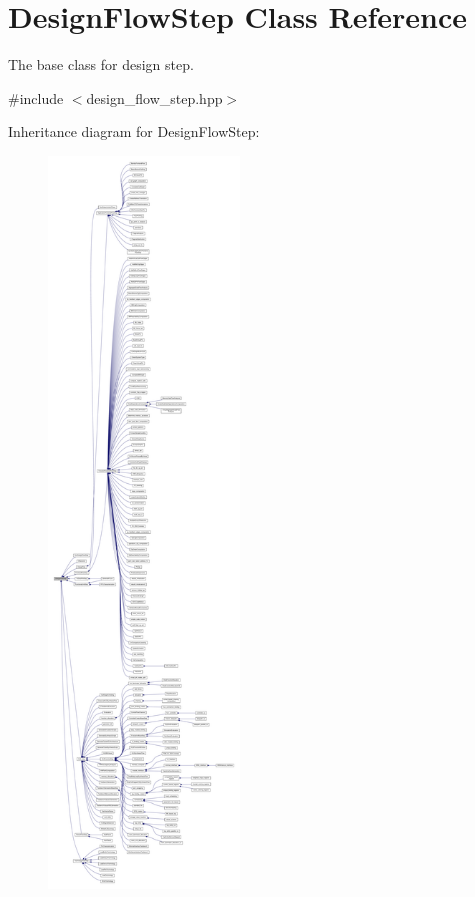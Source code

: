 \hypertarget{classDesignFlowStep}{}\section{Design\+Flow\+Step Class Reference}
\label{classDesignFlowStep}


The base class for design step.  




{\ttfamily \#include $<$design\+\_\+flow\+\_\+step.\+hpp$>$}



Inheritance diagram for Design\+Flow\+Step\+:
\nopagebreak
\begin{figure}[H]
\begin{center}
\leavevmode
\includegraphics[height=550pt]{d7/d4e/classDesignFlowStep__inherit__graph}
\end{center}
\end{figure}


